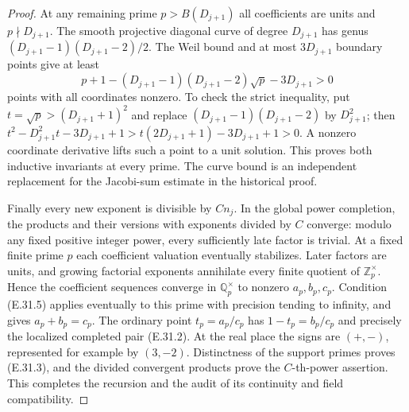 \begin{proof}
At any remaining prime $p>B(D_{j+1})$ all coefficients are units and
$p\nmid D_{j+1}$.  The smooth projective diagonal curve of degree
$D_{j+1}$ has genus $(D_{j+1}-1)(D_{j+1}-2)/2$.  The Weil bound
\cite[(1.5.1) and Theorem (1.6), pp.275--276]{RootDeligne1974}
and at most $3D_{j+1}$ boundary points give at least
\[
 p+1-(D_{j+1}-1)(D_{j+1}-2)\sqrt p-3D_{j+1}>0
\]
points with all coordinates nonzero.  To check the strict inequality,
put $t=\sqrt p>(D_{j+1}+1)^2$ and replace
$(D_{j+1}-1)(D_{j+1}-2)$ by $D_{j+1}^2$; then
$t^2-D_{j+1}^2t-3D_{j+1}+1>
t(2D_{j+1}+1)-3D_{j+1}+1>0$.  A nonzero coordinate derivative
lifts such a point to a unit solution.  This proves both inductive
invariants at every prime.  The curve bound is an independent
replacement for the Jacobi-sum estimate in the historical proof.

Finally every new exponent is divisible by $Cn_j$.  In the global
power completion, the products and their versions with exponents
divided by $C$ converge: modulo any fixed positive integer power,
every sufficiently late factor is trivial.  At a fixed finite prime
$p$ each coefficient valuation eventually stabilizes.  Later factors
are units, and growing factorial exponents annihilate every finite
quotient of $\mathbb Z_p^\times$.  Hence the coefficient sequences
converge in $\mathbb Q_p^\times$ to nonzero $a_p,b_p,c_p$.
Condition (E.31.5) applies eventually to this prime with precision
tending to infinity, and gives $a_p+b_p=c_p$.  The ordinary point
$t_p=a_p/c_p$ has $1-t_p=b_p/c_p$ and precisely the localized
completed pair (E.31.2).  At the real place the signs are $(+,-)$,
represented for example by $(3,-2)$.  Distinctness of the support
primes proves (E.31.3), and the divided convergent products prove the
$C$-th-power assertion.  This completes the recursion and the audit
of its continuity and field compatibility.
\end{proof}

